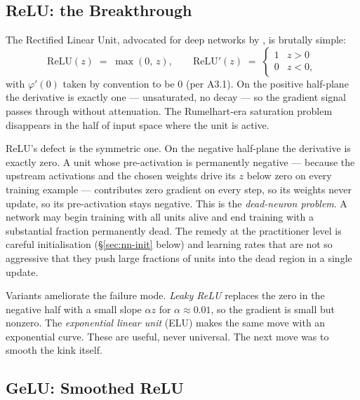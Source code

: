 \subsection{ReLU: the Breakthrough}

The Rectified Linear Unit, advocated for deep networks by
\citet{nair2010rectified}, is brutally simple:
\begin{equation}
  \mathrm{ReLU}(z) \;=\; \max(0,\, z),
  \qquad
  \mathrm{ReLU}'(z) \;=\;
  \begin{cases}
    1 & z > 0 \\
    0 & z < 0,
  \end{cases}
  \label{eq:nn-relu}
\end{equation}
with $\varphi'(0)$ taken by convention to be $0$ (per A3.1). On
the positive half-plane the derivative is exactly one ---
unsaturated, no decay --- so the gradient signal passes through
without attenuation. The Rumelhart-era saturation problem
disappears in the half of input space where the unit is active.

ReLU's defect is the symmetric one. On the negative half-plane
the derivative is exactly zero. A unit whose pre-activation is
permanently negative --- because the upstream activations and
the chosen weights drive its $z$ below zero on every training
example --- contributes zero gradient on every step, so its
weights never update, so its pre-activation stays negative. This
is the \emph{dead-neuron problem}. A network may begin training
with all units alive and end training with a substantial fraction
permanently dead. The remedy at the practitioner level is
careful initialisation (§\ref{sec:nn-init} below) and learning
rates that are not so aggressive that they push large fractions
of units into the dead region in a single update.

Variants ameliorate the failure mode. \emph{Leaky ReLU} replaces
the zero in the negative half with a small slope $\alpha z$ for
$\alpha \approx 0.01$, so the gradient is small but nonzero. The
\emph{exponential linear unit} (ELU) makes the same move with an
exponential curve. These are useful, never universal. The next
move was to smooth the kink itself.

\subsection{GeLU: Smoothed ReLU}


